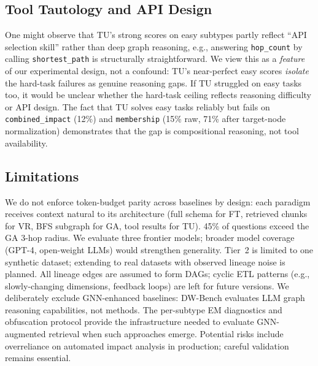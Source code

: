 \subsection{Tool Tautology and API Design}

One might observe that TU's strong scores on easy subtypes partly reflect
``API selection skill'' rather than deep graph reasoning, e.g.,
answering \texttt{hop\_count} by calling \texttt{shortest\_path} is
structurally straightforward.  We view this as a \emph{feature} of our
experimental design, not a confound: TU's near-perfect easy scores
\emph{isolate} the hard-task failures as genuine reasoning gaps.
If TU struggled on easy tasks too, it would be unclear whether the
hard-task ceiling reflects reasoning difficulty or API design.
The fact that TU solves easy tasks reliably but fails on
\texttt{combined\_impact} (12\%) and \texttt{membership} (15\% raw,
71\% after target-node normalization)
demonstrates that the gap is compositional reasoning, not tool availability.

\subsection{Limitations}

We do not enforce token-budget parity across baselines by design:
each paradigm receives context natural to its architecture (full schema
for FT, retrieved chunks for VR, BFS subgraph for GA, tool results
for TU).  45\% of questions exceed the GA 3-hop radius.  We evaluate
three frontier models; broader model coverage (GPT-4, open-weight LLMs)
would strengthen generality.  Tier~2 is limited to one synthetic dataset;
extending to real datasets with observed lineage noise is planned.
All lineage edges are assumed to form DAGs; cyclic ETL patterns
(e.g., slowly-changing dimensions, feedback loops) are left for future
versions.  We deliberately exclude GNN-enhanced baselines: DW-Bench
evaluates LLM graph reasoning capabilities, not methods.  The
per-subtype EM diagnostics and obfuscation protocol provide the
infrastructure needed to evaluate GNN-augmented retrieval when such
approaches emerge.
Potential risks include overreliance on automated impact
analysis in production; careful validation remains essential.
